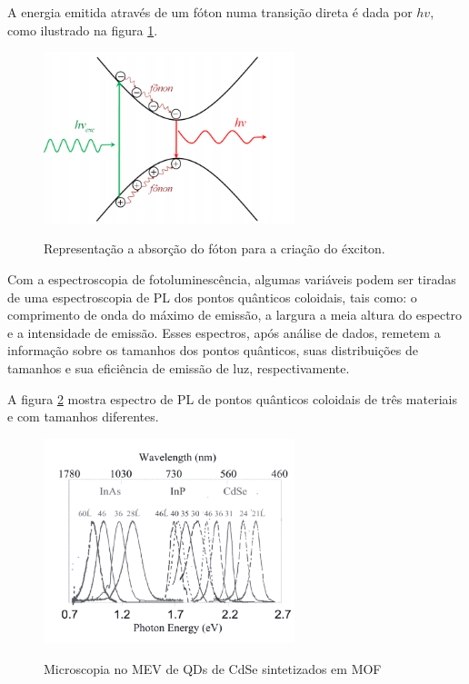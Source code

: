 		\par A energia emitida através de um fóton numa transição direta é dada por $hv$, como ilustrado na figura \ref{fig19}.

		\begin{figure}[H]
		  \centering
		  \caption{Representação a absorção do fóton para a criação do éxciton.\cite{sintese5}}
		  \includegraphics[width=0.65\textwidth]{images/figura19.png}
		  \label{fig19}
		\end{figure}


		\par Com a espectroscopia de fotoluminescência, algumas variáveis podem ser tiradas de uma espectroscopia de PL dos pontos quânticos coloidais, tais como: o comprimento de onda do máximo de emissão, a largura a meia altura do espectro e a intensidade de emissão. Esses espectros, após análise de dados,  remetem a informação sobre os tamanhos dos pontos quânticos, suas distribuições de tamanhos e sua eficiência de emissão de luz, respectivamente. 

		\par A figura \ref{fig20} mostra espectro de PL de pontos quânticos coloidais de três materiais e com tamanhos diferentes.

		\begin{figure}[H]
		  \centering
		  \caption{Microscopia no MEV de QDs de CdSe sintetizados em MOF\cite{sintese3}}
		  \includegraphics[width=0.65\textwidth]{images/figura20.png}
		  \label{fig20}
		\end{figure}

